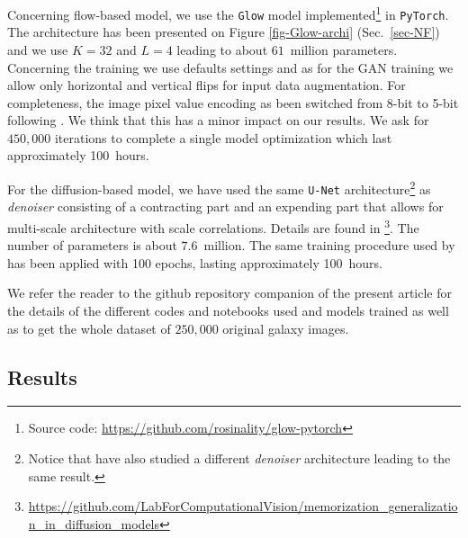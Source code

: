 \documentclass[11pt]{amsart}
\begin{document}
Concerning flow-based model, we use the \texttt{Glow} model implemented\footnote{Source code: \url{https://github.com/rosinality/glow-pytorch}} in \texttt{PyTorch}. The architecture has been presented on Figure \ref{fig-Glow-archi} (Sec.~\ref{sec-NF}) and we use $K=32$ and $L=4$ leading to about $61$~million parameters. Concerning the training we use defaults settings and as for the GAN training we allow only horizontal and vertical flips for input data augmentation. For completeness, the image pixel value encoding as been switched from 8-bit to 5-bit following \cite{Kingma2018}. We think that this has a minor impact on our results. We ask for $450,000$ iterations to complete a single model optimization which last approximately 100~hours.

For the diffusion-based model, we have used the same \texttt{U-Net} architecture\footnote{Notice that \cite{2015arXiv150504597R} have also studied a different \textit{denoiser} architecture leading to the same result.} \citep{2015arXiv150504597R} as \textit{denoiser} consisting of a contracting part and an expending part that allows for multi-scale architecture with scale correlations. Details are found in \cite{kadkhodaie2024generalization}\footnote{\url{https://github.com/LabForComputationalVision/memorization_generalization_in_diffusion_models}}. The number of parameters is about $7.6$~million.  The same training procedure used by \cite{kadkhodaie2024generalization} has been applied with 100 epochs, lasting approximately 100~hours.

{\color{red} We refer the reader to the  github repository companion of the present article for the details of the different codes and notebooks used and models trained as well as to get the whole dataset of $250,000$ original galaxy images.}
%
\subsection{Results}
%
\end{document}
